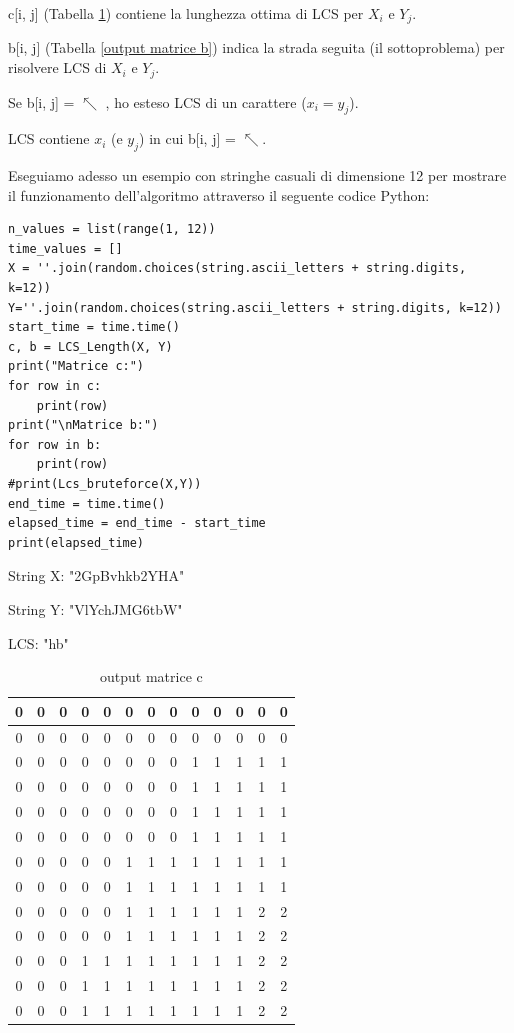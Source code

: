 \documentclass[11pt,a4paper]{article}
\begin{document}
c[i, j] (Tabella \ref{output matrice c}) contiene la lunghezza ottima di LCS per $ X_{i}$ e $Y_{j}$.

b[i, j] (Tabella \ref{output matrice b}) indica la strada seguita (il sottoproblema) per risolvere
LCS di $X_{i}$ e $Y_{j}$.

Se b[i, j] = $\nwarrow$ , ho esteso LCS di un carattere ($x_{i} = y_{j}$).

LCS contiene $x_{i}$ (e $y_{j}$) in cui b[i, j] = $\nwarrow$.


Eseguiamo adesso un esempio con stringhe casuali di dimensione 12 per mostrare il funzionamento dell'algoritmo attraverso il seguente codice Python:
\begin{lstlisting}
n_values = list(range(1, 12))
time_values = []
X = ''.join(random.choices(string.ascii_letters + string.digits, k=12))
Y=''.join(random.choices(string.ascii_letters + string.digits, k=12))
start_time = time.time()
c, b = LCS_Length(X, Y)
print("Matrice c:")
for row in c:
    print(row)
print("\nMatrice b:")
for row in b:
    print(row)
#print(Lcs_bruteforce(X,Y))
end_time = time.time() 
elapsed_time = end_time - start_time
print(elapsed_time)
\end{lstlisting}

String X: "2GpBvhkb2YHA"


String Y: "VlYchJMG6tbW"

LCS: "hb"


\begin{table}[htbp]
    \centering
    \caption{output matrice c}
    \label{output matrice c}
    \begin{tabular}{|*{13}{c|}}
        \hline
        0 & 0 & 0 & 0 & 0 & 0 & 0 & 0 & 0 & 0 & 0 & 0 & 0 \\
        \hline
        0 & 0 & 0 & 0 & 0 & 0 & 0 & 0 & 0 & 0 & 0 & 0 & 0 \\
        \hline
        0 & 0 & 0 & 0 & 0 & 0 & 0 & 0 & 1 & 1 & 1 & 1 & 1 \\
        \hline
        0 & 0 & 0 & 0 & 0 & 0 & 0 & 0 & 1 & 1 & 1 & 1 & 1 \\
        \hline
        0 & 0 & 0 & 0 & 0 & 0 & 0 & 0 & 1 & 1 & 1 & 1 & 1 \\
        \hline
        0 & 0 & 0 & 0 & 0 & 0 & 0 & 0 & 1 & 1 & 1 & 1 & 1 \\
        \hline
        0 & 0 & 0 & 0 & 0 & 1 & 1 & 1 & 1 & 1 & 1 & 1 & 1 \\
        \hline
        0 & 0 & 0 & 0 & 0 & 1 & 1 & 1 & 1 & 1 & 1 & 1 & 1 \\
        \hline
        0 & 0 & 0 & 0 & 0 & 1 & 1 & 1 & 1 & 1 & 1 & 2 & 2 \\
        \hline
        0 & 0 & 0 & 0 & 0 & 1 & 1 & 1 & 1 & 1 & 1 & 2 & 2 \\
        \hline
        0 & 0 & 0 & 1 & 1 & 1 & 1 & 1 & 1 & 1 & 1 & 2 & 2 \\
        \hline
        0 & 0 & 0 & 1 & 1 & 1 & 1 & 1 & 1 & 1 & 1 & 2 & 2 \\
        \hline
        0 & 0 & 0 & 1 & 1 & 1 & 1 & 1 & 1 & 1 & 1 & 2 & 2 \\
        \hline
    \end{tabular}
\end{table}
\end{document}
